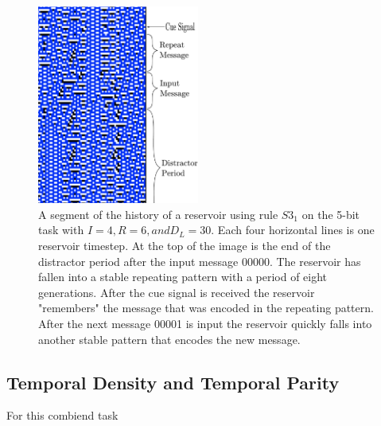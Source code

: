 \documentclass{elsarticle}
\begin{document}
\begin{multicols}{2}
\begin{figure}[H]
\centering
\includegraphics[width=0.475\textwidth]{RepeatMessage.pdf}
\caption{A segment of the history of a reservoir using rule $S3_{1}$ on the 
   5-bit task with $I=4, R=6, and D_{L}=30$. Each four horizontal lines is one 
      reservoir timestep. At the top of the image is the end of the distractor 
      period after the input message 00000. The reservoir has fallen into a 
      stable repeating pattern with a period of eight generations. After the 
      cue signal is received the reservoir "remembers" the message that was 
      encoded in the repeating pattern. After the next message 00001 is input 
      the reservoir quickly falls into another stable pattern that encodes the 
      new message.} 
        
\label{repeat}
\end{figure}

\subsection{Temporal Density and Temporal Parity}
For this combiend task

\iffalse


\end{multicols}
\end{document}
